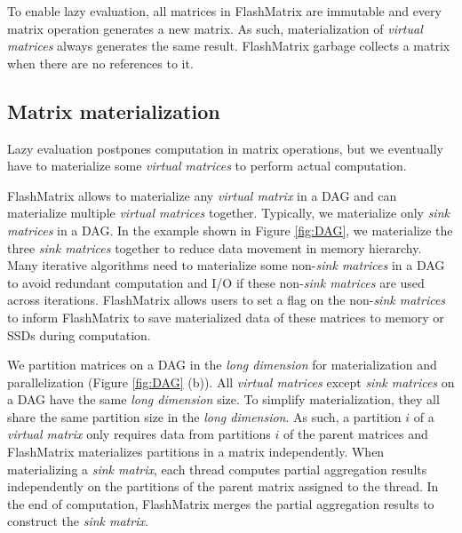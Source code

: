 To enable lazy evaluation, all matrices in FlashMatrix are immutable and every
matrix operation generates a new matrix. As such, materialization of
\textit{virtual matrices} always generates the same result. FlashMatrix
garbage collects a matrix when there are no references to it.

\subsection{Matrix materialization} \label{sec:materialize}
Lazy evaluation postpones computation in matrix operations, but we eventually
have to materialize some \textit{virtual matrices} to perform actual computation.

FlashMatrix allows to materialize any \textit{virtual matrix} in a DAG and
can materialize multiple \textit{virtual matrices} together. Typically, we
materialize only \textit{sink matrices} in a DAG. In the example shown in
Figure \ref{fig:DAG}, we materialize the three \textit{sink matrices} together
to reduce data movement in memory hierarchy. Many iterative algorithms need
to materialize some non-\textit{sink matrices} in a DAG to avoid redundant
computation and I/O if these non-\textit{sink matrices} are used across
iterations. FlashMatrix allows users to set a flag on the
non-\textit{sink matrices} to inform FlashMatrix to save materialized data
of these matrices to memory or SSDs during computation.

We partition matrices on a DAG in the \textit{long dimension} for materialization
and parallelization (Figure \ref{fig:DAG} (b)). All \textit{virtual matrices}
except \textit{sink matrices} on a DAG have the same \textit{long dimension}
size. To simplify materialization, they all share the same partition size in
the \textit{long dimension}.
As such, a partition $i$ of a \textit{virtual matrix} only requires data from
partitions $i$ of the parent matrices and FlashMatrix materializes partitions
in a matrix independently. %
When materializing a \textit{sink matrix}, each thread computes partial
aggregation results independently on the partitions of the parent matrix
assigned to the thread. In the end of computation, FlashMatrix merges
the partial aggregation results to construct the \textit{sink matrix}.

